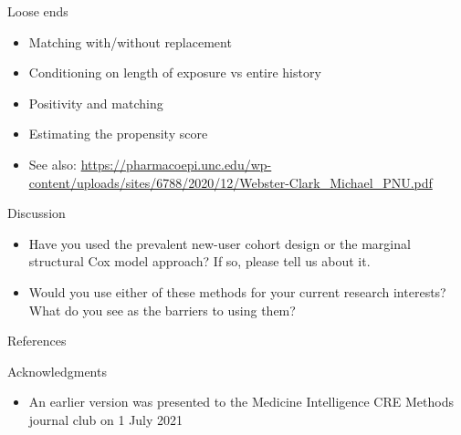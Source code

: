 \documentclass[aspectratio=169,12pt]{beamer} %
\begin{document}
\begin{frame}{Loose ends}
    \begin{itemize}
	\item Matching with/without replacement
	\item Conditioning on length of exposure vs entire history
	\item Positivity and matching
	\item Estimating the propensity score
	\item See also: \url{https://pharmacoepi.unc.edu/wp-content/uploads/sites/6788/2020/12/Webster-Clark_Michael_PNU.pdf}
    \end{itemize}
\end{frame}

\begin{frame}{Discussion}
    \begin{itemize}
	\item Have you used the prevalent new-user cohort design or the marginal structural Cox model approach? If so, please tell us about it.
    	\item Would you use either of these methods for your current research interests? What do you see as the barriers to using them?
    \end{itemize}
\end{frame}

\begin{frame}{References}
        \tiny
        
\end{frame}

\begin{frame}{Acknowledgments}
    \begin{itemize}
	\item An earlier version was presented to the Medicine
	Intelligence CRE Methods journal club on 1 July 2021
    \end{itemize}
\end{frame}
\end{document}
